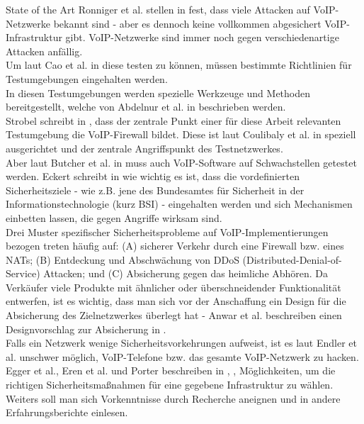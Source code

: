 \documentclass[a4paper,11pt,ngerman]{INSOexpose}
\begin{document}
\begin{section}{State of the Art}
Ronniger et al. stellen in \cite{Ronniger:2010:robflex}  fest, dass viele Attacken auf VoIP-Netzwerke bekannt sind - aber es dennoch keine vollkommen abgesichert VoIP-Infrastruktur gibt. VoIP-Netzwerke sind immer noch gegen verschiedenartige Attacken anfällig. \\
Um laut Cao et al. in \cite{CaoWang:2009:DevLab} diese testen zu können, müssen bestimmte Richtlinien für Testumgebungen eingehalten
werden. \\
In diesen Testumgebungen werden spezielle Werkzeuge und Methoden bereitgestellt, welche von Abdelnur et al. in \cite{Abdelnur:2006:voipass} beschrieben werden.  \\
Strobel schreibt in \cite{Coulibaly:2010:secvoipb}, dass der zentrale Punkt einer für diese Arbeit relevanten Testumgebung die VoIP-Firewall bildet. Diese ist laut Coulibaly et al. in \cite{Coulibaly:2010:secvoipb}  speziell ausgerichtet und der zentrale Angriffspunkt des Testnetzwerkes. \\
Aber laut Butcher et al. in  \cite{Butcher:2007:SecChall}   muss auch VoIP-Software auf Schwachstellen getestet werden. 
Eckert schreibt in  \cite{eckert:2009:sicherheit} wie wichtig es ist, dass die vordefinierten Sicherheitsziele - wie z.B. jene des Bundesamtes für Sicherheit in der Informationstechnologie (kurz BSI) - eingehalten werden und sich
Mechanismen einbetten lassen, die gegen Angriffe wirksam sind. 
\\
Drei Muster spezifischer Sicherheitsprobleme auf VoIP-Implementierungen bezogen treten
häufig auf: (A) sicherer Verkehr durch eine Firewall bzw. eines NATs; (B) Entdeckung und
Abschwächung von DDoS (Distributed-Denial-of-Service) Attacken; und (C) Absicherung
gegen das heimliche Abhören. Da Verkäufer viele Produkte mit ähnlicher oder
überschneidender Funktionalität entwerfen, ist es wichtig, dass man sich vor der
Anschaffung ein Design für die Absicherung des Zielnetzwerkes überlegt hat - Anwar et al. beschreiben einen Designvorschlag zur Absicherung in \cite{Anwar:2006:despatt} .\\
Falls ein Netzwerk wenige Sicherheitsvorkehrungen aufweist, ist es laut Endler et al. \cite{endler:2006:hacking} unschwer möglich, VoIP-Telefone bzw. das gesamte VoIP-Netzwerk zu hacken.
 \\
Egger et al., Eren et al. und Porter beschreiben in \cite{Egger:2008:linVoip} ,\cite{eren:2007:voip} ,\cite{porter:2006:practicalvoip} Möglichkeiten, um die richtigen Sicherheitsmaßnahmen für eine gegebene Infrastruktur zu wählen. Weiters soll man sich Vorkenntnisse durch Recherche aneignen und in andere Erfahrungsberichte einlesen. \\

\end{section}
\pagebreak
\end{document}
